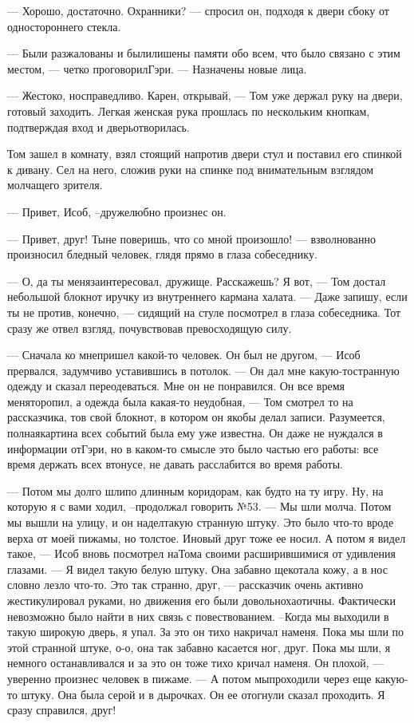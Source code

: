 — Хорошо, достаточно. Охранники? — спросил он, подходя к двери сбоку от одностороннего стекла.

— Были разжалованы и былилишены памяти обо всем, что было связано с этим местом, — четко проговорилГэри. — Назначены новые лица.

— Жестоко, носправедливо. Карен, открывай, — Том уже держал руку на двери, готовый заходить. Легкая женская рука прошлась по нескольким кнопкам, подтверждая вход и дверьотворилась.

Том зашел в комнату, взял стоящий напротив двери стул и поставил его спинкой к дивану. Сел на него, сложив руки на спинке под внимательным взглядом молчащего зрителя.

— Привет, Исоб, –дружелюбно произнес он.

 — Привет, друг! Тыне поверишь, что со мной произошло! — взволнованно произносил бледный человек, глядя прямо в глаза собеседнику.

— О, да ты менязаинтересовал, дружище. Расскажешь? Я вот, — Том достал небольшой блокнот иручку из внутреннего кармана халата. — Даже запишу, если ты не против, конечно, — сидящий на стуле посмотрел в глаза собеседника. Тот сразу же отвел взгляд, почувствовав превосходящую силу.

— Сначала ко мнепришел какой-то человек. Он был не другом, — Исоб прервался, задумчиво уставившись в потолок. — Он дал мне какую-тостранную одежду и сказал переодеваться. Мне он не понравился. Он все время меняторопил, а одежда была какая-то неудобная, — Том смотрел то на рассказчика, тов свой блокнот, в котором он якобы делал записи. Разумеется, полнаякартина всех событий была ему уже известна. Он даже не нуждался в информации отГэри, но в каком-то смысле это было частью его работы: все время держать всех втонусе, не давать расслабится во время работы.

— Потом мы долго шлипо длинным коридорам, как будто на ту игру. Ну, на которую я с вами ходил, –продолжал говорить №53. — Мы шли молча. Потом мы вышли на улицу, и он наделтакую странную штуку. Это было что-то вроде верха от моей пижамы, но толстое. Иновый друг тоже ее носил. А потом я видел такое, — Исоб вновь посмотрел наТома своими расширившимися от удивления глазами. — Я видел такую белую штуку. Она забавно щекотала кожу, а в нос словно лезло что-то. Это так странно, друг, — рассказчик очень активно жестикулировал руками, но движения его были довольнохаотичны. Фактически невозможно было найти в них связь с повествованием. –Когда мы выходили в такую широкую дверь, я упал. За это он тихо накричал наменя. Пока мы шли по этой странной штуке, о-о, она так забавно касается ног, друг. Пока мы шли, я немного останавливался и за это он тоже тихо кричал наменя. Он плохой, — уверенно произнес человек в пижаме. — А потом мыпроходили через еще какую-то штуку. Она была серой и в дырочках. Он ее отогнули сказал проходить. Я сразу справился, друг!

